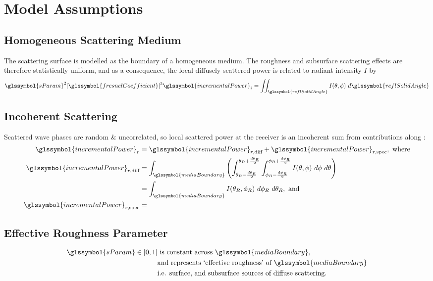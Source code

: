 \documentclass{article}
\newcommand{\totalIncRxPower}{\glssymbol{incrementalPower}_r}
\newcommand{\diffuseIncRxPower}{\glssymbol{incrementalPower}_{r, \text{diff}}}
\newcommand{\specularIncRxPower}{\glssymbol{incrementalPower}_{r, \text{spec}}}
\newcommand{\boundaryIntegral}{\int_{\glssymbol{mediaBoundary}}}
\newcommand{\sParam}{\glssymbol{sParam}}
\newcommand{\fresnel}{\glssymbol{fresnelCoefficient}}
\newcommand{\reflSolAng}{\glssymbol{reflSolidAngle}}
\newcommand{\localIncidentPower}{\glssymbol{incrementalPower}_i}
\newcommand{\radIntensity}{I}
\begin{document}
\newpage
\setcounter{section}{0}   %
\setcounter{subsection}{0}
\setcounter{equation}{0}  %
\section{Model Assumptions}
\subsection{Homogeneous Scattering Medium}
The scattering surface is modelled as the boundary of a homogeneous medium.
The roughness and subsurface scattering effects are therefore statistically uniform,
and as a consequence, the local diffusely scattered power is related to radiant
intensity $\radIntensity$ by
\begin{equation}
   \sParam^2 |\fresnel|^2 \localIncidentPower = \iint_{\reflSolAng} \radIntensity( \theta, \phi ) \
      d \reflSolAng
   \label{eq:homogeneousScatter}
\end{equation}
\subsection{Incoherent Scattering}
Scattered wave phases are random \& uncorrelated, so local scattered power at the receiver is
an incoherent sum from contributions along \glssymbol{mediaBoundary} : 
\begin{subequations}
\begin{align}
   \totalIncRxPower &= \diffuseIncRxPower + \specularIncRxPower, \text{ where}
      \label{eq:incPowerSplit} \\
   \diffuseIncRxPower &= \boundaryIntegral \left( \int_{\theta_{R} - \frac{d
      \theta_{R}}{2}}^{\theta_{R} + \frac{d \theta_{R}}{2}}
      \int_{\phi_{R} - \frac{d \phi_{R}}{2}}^{\phi_{R} + \frac{d
      \phi_{R}}{2}} \radIntensity ( \theta, \phi ) \ d \phi \ d \theta \right) \nonumber \\
   &= \boundaryIntegral \radIntensity ( \theta_R, \phi_R ) \ d \phi_R \ d \theta_R, \text{ and}
      \label{eq:incoherence} \\
   \specularIncRxPower &= 
\end{align}
\end{subequations}
\subsection{Effective Roughness Parameter }
\begin{equation}
\begin{split}
   \glssymbol{sParam} \in [0,1] & \text{ is constant across }
      \glssymbol{mediaBoundary}, \\
   & \text{and represents `effective roughness' of } \glssymbol{mediaBoundary} \\
   & \text{i.e. surface, and subsurface sources of diffuse scattering.}
   \label{eq:constantDiffuseReflectance}
\end{split}
\end{equation}
\end{document}
